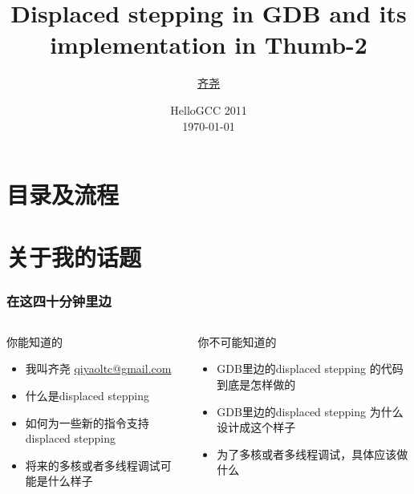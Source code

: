 \documentclass[cjk]{beamer}  %
\begin{document}
\begin{CJK}{UTF8}{gbsn}

\title{Displaced stepping in GDB and its implementation in Thumb-2}
\author{\href{mailto:qiyaoltc@gmail.com}{齐尧}}
\date{HelloGCC 2011 \\ \today}

\frame{\titlepage}


\section{目录及流程}
\frame{
    \tableofcontents
}

\section{关于我的话题}

\begin{frame}
  \frametitle{在这四十分钟里边}
  \begin{columns}
    \column{5cm}
    \begin{overprint}

      \begin{block}{你能知道的}
        \begin{itemize}
        \item 我叫齐尧 \href{mailto:qiyaoltc@gmail.com}{qiyaoltc@gmail.com}
        \item 什么是displaced stepping
        \item 如何为一些新的指令支持displaced stepping
        \item 将来的多核或者多线程调试可能是什么样子
        \end{itemize}
      \end{block}
    \end{overprint}

    \column{5cm}
    \begin{overprint}
      \begin{block}{你不可能知道的}
        \begin{itemize}
        \item GDB里边的displaced stepping 的代码到底是怎样做的
        \item GDB里边的displaced stepping 为什么设计成这个样子
        \item 为了多核或者多线程调试，具体应该做什么
        \end{itemize}
      \end{block}
    \end{overprint}
  \end{columns}
\end{frame}


\end{CJK}
\end{document}

